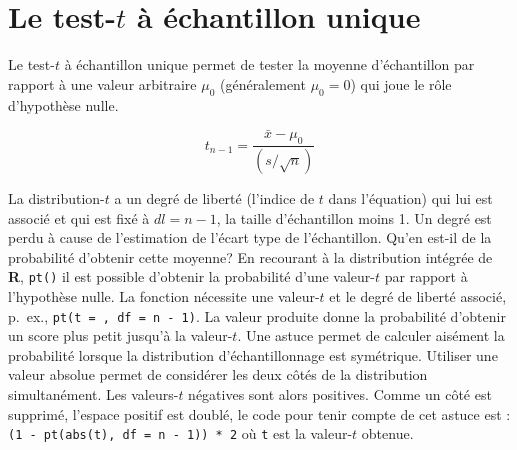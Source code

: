 \documentclass[
]{book}
\begin{document}
\hypertarget{le-test-t-uxe0-uxe9chantillon-unique}{%
\section{\texorpdfstring{Le test-\(t\) à échantillon unique}{Le test-t à échantillon unique}}\label{le-test-t-uxe0-uxe9chantillon-unique}}

Le test-\(t\) à échantillon unique permet de tester la moyenne d'échantillon par rapport à une valeur arbitraire \(\mu_0\) (généralement \(\mu_0 = 0\)) qui joue le rôle d'hypothèse nulle.

\[ t_{n-1} = \frac{\bar{x}-\mu_0}{(s/\sqrt{n})} \]

La distribution-\(t\) a un degré de liberté (l'indice de \(t\) dans l'équation) qui lui est associé et qui est fixé à \(dl = n - 1\), la taille d'échantillon moins 1. Un degré est perdu à cause de l'estimation de l'écart type de l'échantillon. Qu'en est-il de la probabilité d'obtenir cette moyenne? En recourant à la distribution intégrée de \textbf{R}, \texttt{pt()} il est possible d'obtenir la probabilité d'une valeur-\(t\) par rapport à l'hypothèse nulle. La fonction nécessite une valeur-\(t\) et le degré de liberté associé, p.~ex., \texttt{pt(t\ =\ ,\ df\ =\ n\ -\ 1)}. La valeur produite donne la probabilité d'obtenir un score plus petit jusqu'à la valeur-\(t\). Une astuce permet de calculer aisément la probabilité lorsque la distribution d'échantillonnage est symétrique. Utiliser une valeur absolue permet de considérer les deux côtés de la distribution simultanément. Les valeurs-\(t\) négatives sont alors positives. Comme un côté est supprimé, l'espace positif est doublé, le code pour tenir compte de cet astuce est : \texttt{(1\ -\ pt(abs(t),\ df\ =\ n\ -\ 1))\ *\ 2} où \texttt{t} est la valeur-\(t\) obtenue.
\end{document}
